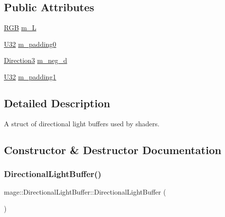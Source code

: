 \subsection*{Public Attributes}
\begin{DoxyCompactItemize}
\item 
\hyperlink{structmage_1_1_r_g_b}{R\+GB} \hyperlink{structmage_1_1_directional_light_buffer_a9f7b75a474c2f28176aeb5207ff653dd}{m\+\_\+L}
\item 
\hyperlink{namespacemage_a41c104c036fba3756a74e19f793eeaa1}{U32} \hyperlink{structmage_1_1_directional_light_buffer_aac8d40f7af8eac8b2fb79085843be4fd}{m\+\_\+padding0}
\item 
\hyperlink{structmage_1_1_direction3}{Direction3} \hyperlink{structmage_1_1_directional_light_buffer_af3a1952cf82b66730868573a4b581ab4}{m\+\_\+neg\+\_\+d}
\item 
\hyperlink{namespacemage_a41c104c036fba3756a74e19f793eeaa1}{U32} \hyperlink{structmage_1_1_directional_light_buffer_ab94c0c42a54c9751dde8a4a2a84da861}{m\+\_\+padding1}
\end{DoxyCompactItemize}


\subsection{Detailed Description}
A struct of directional light buffers used by shaders. 

\subsection{Constructor \& Destructor Documentation}
\hypertarget{structmage_1_1_directional_light_buffer_a73a87ba7b016b6c62375da62b4fdf7b6}{}\label{structmage_1_1_directional_light_buffer_a73a87ba7b016b6c62375da62b4fdf7b6} 
\subsubsection{\texorpdfstring{Directional\+Light\+Buffer()}{DirectionalLightBuffer()}\hspace{0.1cm}{\footnotesize\ttfamily [1/3]}}
{\footnotesize\ttfamily mage\+::\+Directional\+Light\+Buffer\+::\+Directional\+Light\+Buffer (\begin{DoxyParamCaption}{ }\end{DoxyParamCaption})}

